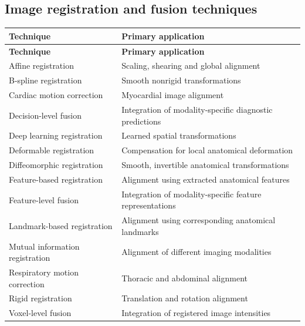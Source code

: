 \subsection{Image registration and fusion techniques}
\begin{longtable}{@{}p{}p{}@{}}
\toprule
\textbf{Technique} & \textbf{Primary application} \\
\midrule
\endfirsthead
\toprule
\textbf{Technique} & \textbf{Primary application} \\
\midrule
\endhead
Affine registration & Scaling, shearing and global alignment \\
B-spline registration & Smooth nonrigid transformations \\
Cardiac motion correction & Myocardial image alignment \\
Decision-level fusion & Integration of modality-specific diagnostic predictions \\
Deep learning registration & Learned spatial transformations \\
Deformable registration & Compensation for local anatomical deformation \\
Diffeomorphic registration & Smooth, invertible anatomical transformations \\
Feature-based registration & Alignment using extracted anatomical features \\
Feature-level fusion & Integration of modality-specific feature representations \\
Landmark-based registration & Alignment using corresponding anatomical landmarks \\
Mutual information registration & Alignment of different imaging modalities \\
Respiratory motion correction & Thoracic and abdominal alignment \\
Rigid registration & Translation and rotation alignment \\
Voxel-level fusion & Integration of registered image intensities \\
\bottomrule
\end{longtable}

